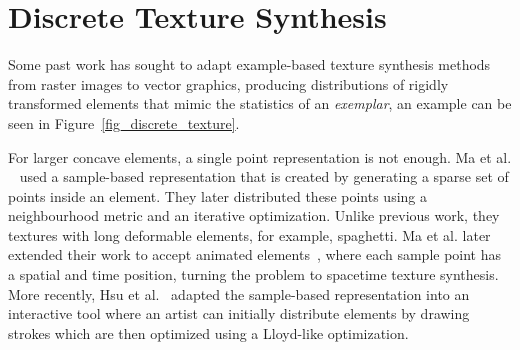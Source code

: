 \section{Discrete Texture Synthesis}



\newtext
{
Some past work has sought to adapt example-based texture synthesis methods
from raster images to vector graphics, producing distributions of
rigidly transformed elements that mimic the statistics of an \textit{exemplar}, 
an example can be seen in Figure~\ref{fig_discrete_texture}.}

\newtext
{
For larger concave elements, a single point representation is not enough.
Ma et al. ~\cite{Ma2011} used a sample-based representation that
is created by generating a sparse set of points inside an element.
They later distributed these points using a neighbourhood metric and an iterative optimization.
Unlike previous work, they  textures with long deformable elements, for example, spaghetti.
Ma et al. later extended their work to accept animated elements~\cite{Ma2013}, where
each sample point has a spatial and time position, turning the problem to spacetime texture synthesis.
More recently, Hsu et al.~\cite{Hsu2020} adapted the sample-based representation into an interactive tool
where an artist can initially distribute elements by drawing strokes
which are then optimized using a Lloyd-like optimization.
}



